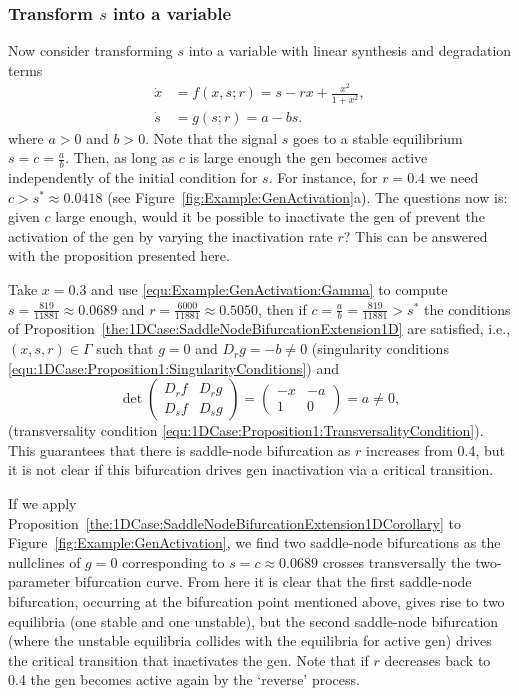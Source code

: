 \documentclass[12pt]{article}
\begin{document}
\subsubsection{Transform $s$ into a variable}
Now consider transforming $s$ into a variable with linear synthesis and degradation terms
\begin{equation}
    \begin{aligned}
        \dot x & = f(x,s;r) = s - rx + \frac{x^{2}}{1+x^{2}}, \\
        \dot s & = g(s;r) = a - bs.
    \end{aligned}
    \label{equ:Example:GenActivation2:2D}
\end{equation}
where $a>0$ and $b>0$. Note that the signal $s$ goes to a stable equilibrium $s=c=\frac{a}{b}$. Then, as long as $c$ is large enough the gen becomes active independently of the initial condition for $s$. For instance, for $r=0.4$ we need $c>s^*\approx0.0418$ (see Figure~\ref{fig:Example:GenActivation}a). The questions now is: given $c$ large enough, would it be possible to inactivate the gen of prevent the activation of the gen by varying the inactivation rate $r$? This can be answered with the proposition presented here.

Take $x=0.3$ and use \eqref{equ:Example:GenActivation:Gamma} to compute $s=\tfrac{819}{11881}\approx0.0689$ and $r=\tfrac{6000}{11881}\approx 0.5050$, then if $c=\frac{a}{b}=\tfrac{819}{11881}>s^*$ the conditions of Proposition~\ref{the:1DCase:SaddleNodeBifurcationExtension1D} are satisfied, i.e., $(x,s,r)\in\Gamma$ such that $g=0$ and $D_{r}g=-b\neq 0$ (singularity conditions \eqref{equ:1DCase:Proposition1:SingularityConditions}) and
\[\det\begin{pmatrix}
            D_{r}f & D_{r}g \\
            D_{s}f & D_{s}g
        \end{pmatrix} = 
        \begin{pmatrix}
            -x & -a\\
            1 & 0
        \end{pmatrix} = a \neq 0,\]
(transversality condition \eqref{equ:1DCase:Proposition1:TransversalityCondition}). This guarantees that there is saddle-node bifurcation as $r$ increases from 0.4, but it is not clear if this bifurcation drives gen inactivation via a critical transition. 

If we apply Proposition~\ref{the:1DCase:SaddleNodeBifurcationExtension1DCorollary} to Figure~\ref{fig:Example:GenActivation}, we find two saddle-node bifurcations as the nullclines of $g=0$ corresponding to $s=c\approx0.0689$ crosses transversally the two-parameter bifurcation curve. From here it is clear that the first saddle-node bifurcation, occurring at the bifurcation point mentioned above, gives rise to two equilibria (one stable and one unstable), but the second saddle-node bifurcation (where the unstable equilibria collides with the equilibria for active gen) drives the critical transition that inactivates the gen. Note that if $r$ decreases back to 0.4 the gen becomes active again by the `reverse' process.
\end{document}

